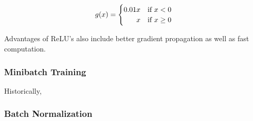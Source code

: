 \begin{equation}
g(x) =
    \begin{cases}
        \hfill 0.01x & \text{if $x < 0$}\\
        \hfill x & \text{if $x \ge 0$}
    \end{cases}
\end{equation}

Advantages of ReLU's also include better gradient propagation as well as fast computation.

\subsubsection{Minibatch Training}

Historically,


\subsubsection{Batch Normalization}






